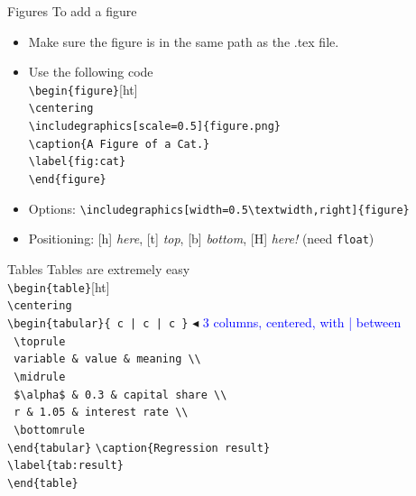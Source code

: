 \documentclass[
11pt, %
]{beamer}
\newcommand{\blue}[1]{\textcolor{blue}{#1}}
\begin{document}
	\begin{frame}{Figures}
		To add a figure
		\begin{itemize}
			\item Make sure the figure is in the same path as the .tex file.
			\item Use the following code \\
			\texttt{\textbackslash begin\{figure\}}[ht] \\
			\texttt{\textbackslash centering} \\
			\texttt{\textbackslash includegraphics[scale=0.5]\{figure.png\}} \\
			\texttt{\textbackslash caption\{A Figure of a Cat.\}} \\
			\texttt{\textbackslash label\{fig:cat\}} \\
			\texttt{\textbackslash end\{figure\}}
			\item Options: \texttt{\textbackslash includegraphics[width=0.5\textbackslash textwidth,right]\{figure\}}
			\item Positioning: [h] \textit{here}, [t] \textit{top}, [b] \textit{bottom}, [H] \textit{here!} (need \texttt{float})
		\end{itemize}
	\end{frame}
	
	\begin{frame}{Tables}
		Tables are extremely easy \\
		
		\texttt{\textbackslash begin\{table\}}[ht] \\
		\texttt{\textbackslash centering} \\
		\texttt{\textbackslash begin\{tabular\}\{ c | c | c \}} $\blacktriangleleft$ \blue{3 columns, centered, with | between} \\
			\texttt{ \textbackslash toprule  } \\
			\texttt{ variable \& value \& meaning \textbackslash \textbackslash } \\
			\texttt{ \textbackslash midrule  } \\
			\texttt{ \$\textbackslash alpha\$ \& 0.3 \& capital share \textbackslash \textbackslash } \\
			\texttt{ r \& 1.05 \& interest rate \textbackslash \textbackslash } \\
			\texttt{ \textbackslash bottomrule } \\
			\texttt{\textbackslash end\{tabular\}}
			\texttt{\textbackslash caption\{Regression result\}} \\
			\texttt{\textbackslash label\{tab:result\}} \\
			\texttt{\textbackslash end\{table\}}
	\end{frame}
	
\end{document}

